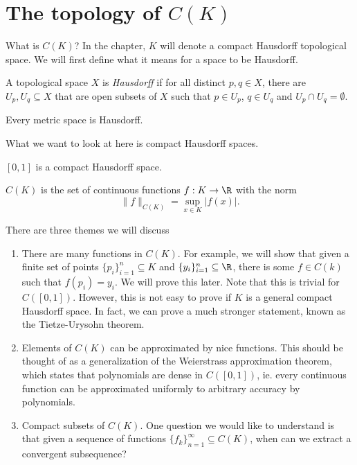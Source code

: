 \documentclass[a4paper]{article}
\begin{document}
\section{The topology of \texorpdfstring{$C(K)$}{C(K)}}
What is $C(K)$? In the chapter, $K$ will denote a compact Hausdorff topological space. We will first define what it means for a space to be Hausdorff.

\begin{defi}
  A topological space $X$ is \emph{Hausdorff} if for all distinct $p, q \in X$, there are $U_p, U_q \subseteq X$ that are open subsets of $X$ such that $p \in U_p$, $q\in U_q$ and $U_p\cap U_q = \emptyset$.
\end{defi}

\begin{eg}
  Every metric space is Hausdorff.
\end{eg}

What we want to look at here is compact Hausdorff spaces.
\begin{eg}
  $[0, 1]$ is a compact Hausdorff space.
\end{eg}

\begin{notation}
  $C(K)$ is the set of continuous functions $f: K \to \R$ with the norm
  \[
    \|f\|_{C(K)} = \sup_{x \in K} |f(x)|.
  \]
\end{notation}
There are three themes we will discuss
\begin{enumerate}
  \item There are many functions in $C(K)$. For example, we will show that given a finite set of points $\{p_i\}_{i = 1}^n \subseteq K$ and $\{y_i\}_{i = 1}^n \subseteq \R$, there is some $f \in C(k)$ such that $f(p_i) = y_i$. We will prove this later. Note that this is trivial for $C([0, 1])$. However, this is not easy to prove if $K$ is a general compact Hausdorff space. In fact, we can prove a much stronger statement, known as the Tietze-Urysohn theorem.

  \item Elements of $C(K)$ can be approximated by nice functions. This should be thought of as a generalization of the Weierstrass approximation theorem, which states that polynomials are dense in $C([0, 1])$, ie. every continuous function can be approximated uniformly to arbitrary accuracy by polynomials.

  \item Compact subsets of $C(K)$. One question we would like to understand is that given a sequence of functions $\{f_k\}_{n = 1}^\infty \subseteq C(K)$, when can we extract a convergent subsequence?
\end{enumerate}
\end{document}
